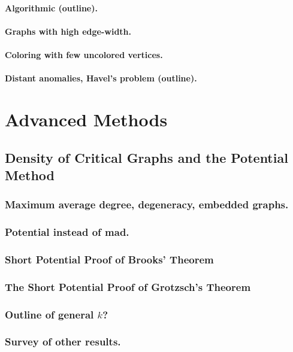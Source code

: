 \documentclass[12pt,twoside,openright,a4paper]{book}
\begin{document}
\subsection{Algorithmic (outline).}
\subsection{Graphs with high edge-width.}
\subsection{Coloring with few uncolored vertices.}
\subsection{Distant anomalies, Havel's problem (outline).}

\part{Advanced Methods}

\chapter{Density of Critical Graphs and the Potential Method}\label{chap:potential}


\section{Maximum average degree, degeneracy, embedded graphs.}
\section{Potential instead of mad.}
\section{Short Potential Proof of Brooks' Theorem}
\section{The Short Potential Proof of Grotzsch's Theorem}
\section{Outline of general $k$?}
\section{Survey of other results.}
\end{document}
